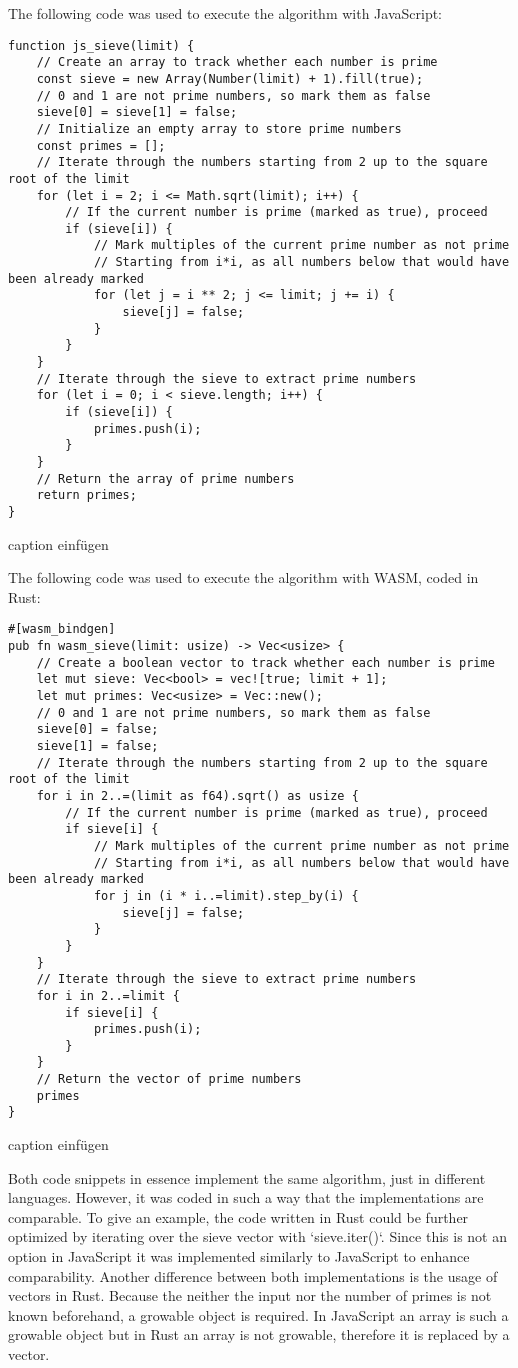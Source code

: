 The following code was used to execute the algorithm with JavaScript:
\begin{verbatim}
function js_sieve(limit) {
    // Create an array to track whether each number is prime
    const sieve = new Array(Number(limit) + 1).fill(true);
    // 0 and 1 are not prime numbers, so mark them as false
    sieve[0] = sieve[1] = false;
    // Initialize an empty array to store prime numbers
    const primes = [];
    // Iterate through the numbers starting from 2 up to the square root of the limit
    for (let i = 2; i <= Math.sqrt(limit); i++) {
        // If the current number is prime (marked as true), proceed
        if (sieve[i]) {
            // Mark multiples of the current prime number as not prime
            // Starting from i*i, as all numbers below that would have been already marked
            for (let j = i ** 2; j <= limit; j += i) {
                sieve[j] = false;
            }
        }
    }
    // Iterate through the sieve to extract prime numbers
    for (let i = 0; i < sieve.length; i++) {
        if (sieve[i]) {
            primes.push(i);
        }
    }
    // Return the array of prime numbers
    return primes;
}
\end{verbatim}
caption einfügen

The following code was used to execute the algorithm with WASM, coded in Rust:
\begin{verbatim}
#[wasm_bindgen]
pub fn wasm_sieve(limit: usize) -> Vec<usize> {
    // Create a boolean vector to track whether each number is prime
    let mut sieve: Vec<bool> = vec![true; limit + 1];
    let mut primes: Vec<usize> = Vec::new();
    // 0 and 1 are not prime numbers, so mark them as false
    sieve[0] = false;
    sieve[1] = false;
    // Iterate through the numbers starting from 2 up to the square root of the limit
    for i in 2..=(limit as f64).sqrt() as usize {
        // If the current number is prime (marked as true), proceed
        if sieve[i] {
            // Mark multiples of the current prime number as not prime
            // Starting from i*i, as all numbers below that would have been already marked
            for j in (i * i..=limit).step_by(i) {
                sieve[j] = false;
            }
        }
    }
    // Iterate through the sieve to extract prime numbers
    for i in 2..=limit {
        if sieve[i] {
            primes.push(i);
        }
    }
    // Return the vector of prime numbers
    primes
}
\end{verbatim}
caption einfügen 

Both code snippets in essence implement the same algorithm, just in different languages. However, it was coded in such a way that the implementations are comparable. To give an example, the code written in Rust could be further optimized by iterating over the sieve vector with `sieve.iter()`. Since this is not an option in JavaScript it was implemented similarly to JavaScript to enhance comparability. Another difference between both implementations is the usage of vectors in Rust. Because the neither the input nor the number of primes is not known beforehand, a growable object is required. In JavaScript an array is such a growable object but in Rust an array is not growable, therefore it is replaced by a vector. 


